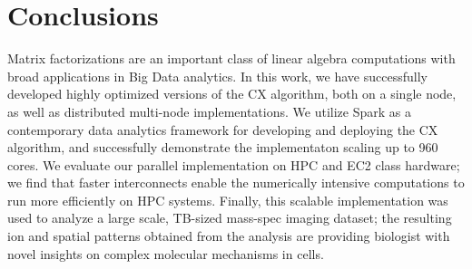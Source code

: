 \section{Conclusions}
\label{sec:conclusion}

Matrix factorizations are an important class of linear algebra computations
with broad applications in Big Data analytics. In this work, we have
successfully developed highly optimized versions of the CX algorithm, both on a
single node, as well as distributed multi-node implementations. We utilize
Spark as a contemporary data analytics framework for developing and deploying
the CX algorithm, and successfully demonstrate the implementaton scaling up to
960 cores. We evaluate our parallel implementation on HPC and EC2 class
hardware; we find that faster interconnects enable the numerically intensive
computations to run more efficiently on HPC systems. Finally, this scalable
implementation was used to analyze a large scale, TB-sized mass-spec imaging
dataset; the resulting ion and spatial patterns obtained from the analysis are
providing biologist with novel insights on complex molecular mechanisms in
cells. 
